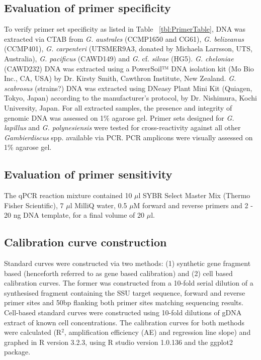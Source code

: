 \documentclass[12pt]{article}
\begin{document}
\subsection{Evaluation of primer specificity}
To verify primer set specificity as listed in Table ~\ref{tbl:PrimerTable}, DNA was extracted via CTAB from \emph{G. australes} (CCMP1650 and CG61), \emph{G. belizeanus} (CCMP401), \emph{G. carpenteri} (UTSMER9A3, donated by Michaela Larrsson, UTS, Australia), \emph{G. pacificus} (CAWD149) and \emph{G.} cf. \emph{silvae} (HG5). \emph{G. cheloniae} (CAWD232) DNA was extracted using a PowerSoil™ DNA isolation kit (Mo Bio Inc., CA, USA) by Dr. Kirsty Smith, Cawthron Institute, New Zealand. \emph{G. scabrosus} (strains?) DNA was extracted using DNeasy Plant Mini Kit (Quiagen, Tokyo, Japan) according to the manufacturer's protocol, by Dr. Nishimura, Kochi University, Japan. For all extracted samples, the presence and integrity of genomic DNA was assessed on 1\% agarose gel. Primer sets designed for \emph{G. lapillus} and \emph{G. polynesiensis} were tested for cross-reactivity against all other \emph{Gambierdiscus} spp. available via PCR. PCR amplicons were visually assessed on 1\% agarose gel.


\subsection{Evaluation of primer sensitivity}
The qPCR reaction mixture contained 10 $\mu$l SYBR Select Master Mix (Thermo Fisher Scientific), 7 $\mu$l MilliQ water, 0.5 $\mu$M forward and reverse primers and 2 - 20 ng DNA template, for a final volume of 20 $\mu$l.
\subsection{Calibration curve construction}
Standard curves were constructed via two methods: (1) synthetic gene fragment based (henceforth referred to as gene based calibration) and (2) cell based calibration curves. The former was constructed from a 10-fold serial dilution of a synthesised fragment containing the SSU target sequence, forward and reverse primer sites and 50bp flanking both primer sites matching sequencing results. Cell-based standard curves were constructed using 10-fold dilutions of gDNA extract of known cell concentrations.
The calibration curves for both methods were calculated (R$^{2}$, amplification efficiency (AE) and regression line slope) and graphed in R version 3.2.3, using R studio version 1.0.136 and the ggplot2 package. 
\end{document}
